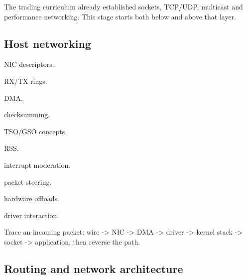 \documentclass[11pt,letterpaper]{article}
\begin{document}
\label{stage:5}

The trading curriculum already established sockets, TCP/UDP, multicast and performance networking. This stage starts both below and above that layer.

\subsection*{Host networking}

\begin{topics}

\item NIC descriptors.

\item RX/TX rings.

\item DMA.

\item checksumming.

\item TSO/GSO concepts.

\item RSS.

\item interrupt moderation.

\item packet steering.

\item hardware offloads.

\item driver interaction.

\end{topics}

Trace an incoming packet: wire -> NIC -> DMA -> driver -> kernel stack -> socket -> application, then reverse the path.

\subsection*{Routing and network architecture}
\end{document}
